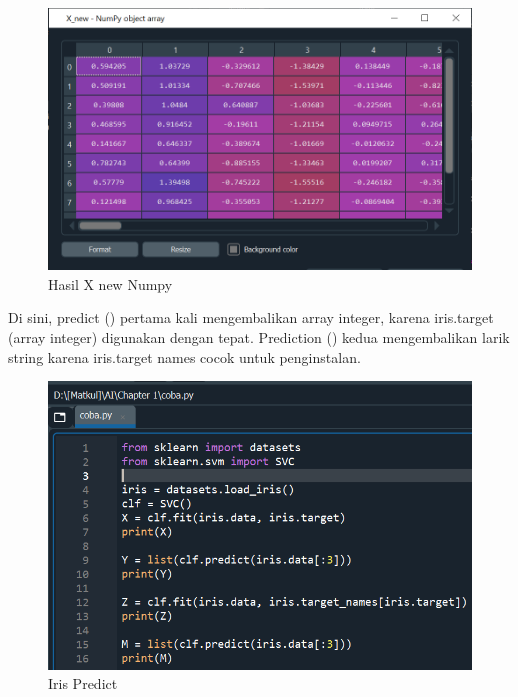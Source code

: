     \begin{figure}[H]
    \centering
    \includegraphics[width=13cm]{figures/1184023/18.PNG}
    \caption{Hasil X new Numpy}
    \end{figure}
    
\par Di sini, predict () pertama kali mengembalikan array integer, karena iris.target (array integer) digunakan dengan tepat. Prediction () kedua mengembalikan larik string karena iris.target names cocok untuk penginstalan.

    \begin{figure}[H]
    \centering
    \includegraphics[width=13cm]{figures/1184023/22.PNG}
    \caption{Iris Predict}
    \end{figure}

